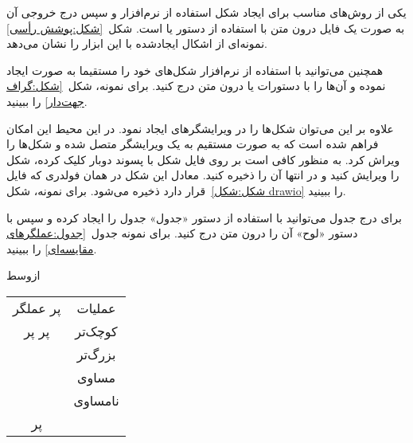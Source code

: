 
یکی از روش‌های مناسب برای ایجاد شکل استفاده از نرم‌افزار  و سپس
درج خروجی آن به صورت یک فایل  درون متن
با استفاده از دستور   یا  است. شکل~\autoref{شکل:پوشش رأسی} نمونه‌ای از اشکال ایجادشده با این ابزار را نشان می‌دهد.

\begin{شکل}[ht]
\end{شکل}

\bigskip

همچنین می‌توانید با استفاده از نرم‌افزار  شکل‌های خود را مستقیما
به صورت  ایجاد نموده و آن‌ها را با دستورات  یا  
درون متن درج کنید. برای نمونه، شکل~\autoref{شکل:گراف جهت‌دار} را ببینید.


\begin{شکل}[ht]
\end{شکل}

علاوه بر این می‌توان شکل‌ها را در ویرایشگرهای   ایجاد نمود. در این محیط این امکان فراهم شده است که به صورت مستقیم به یک ویرایشگر  متصل شده و شکل‌ها را ویراش کرد. به منظور کافی است بر روی فایل شکل با پسوند  دوبار کلیک کرده، شکل را ویرایش کنید و در انتها آن را ذخیره کنید. معادل  این شکل در همان فولدری که فایل  قرار دارد ذخیره می‌شود.
 برای نمونه، شکل~\autoref{شکل:شکل drawio} را ببینید.

\begin{شکل}[ht]
\end{شکل}




برای درج جدول می‌توانید با استفاده از دستور  «جدول»
جدول را ایجاد کرده و سپس با دستور  «لوح»  آن را درون متن درج کنید.
برای نمونه جدول~\autoref{جدول:عملگرهای مقایسه‌ای} را ببینید.

\vspace{1.5em}

\begin{لوح}[ht]
‌ازوسط

\begin{tabular}{|c|c|}
‌پر
 عملگر &  عملیات \\
‌پر ‌پر
\mycood{<} & کوچک‌تر \\
\mycood{>} & بزرگ‌تر \\
\mycood{==} &  مساوی \\
\mycood{<>} & نامساوی \\
‌پر
\end{tabular}

\end{لوح}



